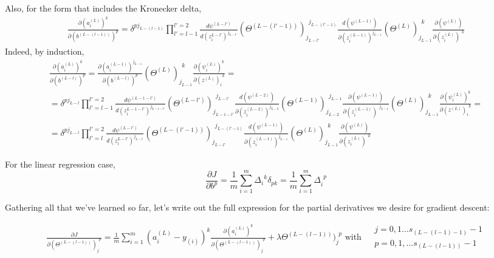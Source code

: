 \documentclass[10pt]{amsart}
\begin{document}
\begin{multicols*}{2}
Also, for the form that includes the Kronecker delta, 
\begin{equation}
\begin{gathered}
\boxed{ \frac{ \partial (a_i^{(L)})^k }{ \partial (b^{(L-(l-1))})^p} = \delta^{pj_{L-(l-1)}} \prod_{l'=l-1}^{l'=2} \frac{d\psi^{(L-l')}}{ d(z_i^{L-l'})^{j_{L-l'}} } (\Theta^{(L-(l'-1))})_{j_{L-l'}}^{\  \  j_{L-(l'-1)}}  \frac{ d ( \psi^{(L-1)}) }{ \partial (z_i^{(L-1)})^{  j_{L-1} } }  ( \Theta^{(L)})_{ j_{L-1} }^{\  \  k} \frac{ \partial ( \psi^{(L)}) }{ \partial (z_i^{(L)})^{\  \  k } }     }
\end{gathered}
\end{equation}
Indeed, by induction, 
\[
\begin{gathered}
\frac{ \partial (a_i^{(L)})^k }{ \partial (b^{(L-l)})^p } = \frac{ \partial ( a_i^{(L-1)})^{ j_{L-1} } }{ \partial (b^{(L-l)})^{    p } }  ( \Theta^{(L)})_{ j_{L-1} }^{\  \  k} \frac{ \partial ( \psi_i^{(L)})^{ k } }{ \partial (z^{(L)})_i^{\  \  k } }   = \\ 
= \delta^{pj_{L-l}} \prod_{l'=l-1}^{l'=2} \frac{d\psi^{(L-1-l')}}{ d(z_i^{L-1-l'})^{j_{L-1-l'}} } (\Theta^{(L-l')})_{j_{L-1-l'}}^{\  \  j_{L-l'}}  \frac{ d ( \psi^{(L-2)}) }{ \partial (z_i^{(L-2)})^{  j_{L-2} } }  ( \Theta^{(L-1)})_{ j_{L-2} }^{\  \  j_{L-1}} \frac{ \partial ( \psi^{(L-1)}) }{ \partial (z_i^{(L-1)})^{\  \  j_{L-1} } } ( \Theta^{(L)})_{ j_{L-1} }^{\  \  k} \frac{ \partial ( \psi_i^{(L)})^{ k } }{ \partial (z^{(L)})_i^{\  \  k } }  = \\
= \delta^{pj_{L-l}} \prod_{l'=l}^{l'=2} \frac{d\psi^{(L-l')}}{ d(z_i^{L-l'})^{j_{L-l'}} } (\Theta^{(L-(l'-1))})_{j_{L-l'}}^{\  \  j_{L-(l'-1)}}  \frac{ d ( \psi^{(L-1)}) }{ \partial (z_i^{(L-1)})^{  j_{L-1} } }  ( \Theta^{(L)})_{ j_{L-1} }^{\  \  k} \frac{ \partial ( \psi^{(L)}) }{ \partial (z_i^{(L)})^{\  \  k } } 
\end{gathered} \]


For the linear regression case, 
\[
\frac{ \partial J}{ \partial b^p} = \frac{1}{m} \sum_{i=1}^m \Delta_i^{\  \  k } \delta_{pk} = \frac{1}{m} \sum_{i=1}^m \Delta_i^{\  \  p}
\]







Gathering all that we've learned so far, let's write out the full expression for the partial derivatives we desire for gradient descent:  

\begin{equation}
\boxed{ 
\begin{gathered}
\frac{ \partial J }{ \partial ( \Theta^{(L-(l-1))})_j^{\  \  p} } = \frac{1}{m} \sum_{i=1}^m (a_i^{(L)} - y_{(i)})^k \frac{ \partial (a_i^{(L)})^k }{ \partial (\Theta^{(L-(l-1))})_j^{\  \  p} } + \lambda  \Theta^{(L-(l-1))})_j^{\  \  p} \text{ with } \begin{aligned} & j = 0,1\dots s_{(L-(l-1)-1)}-1 \\ & p = 0,1,\dots s_{(L-(l-1))} -1 \end{aligned}
\end{gathered}	
}
\end{equation}


\end{multicols*}
\end{document}
